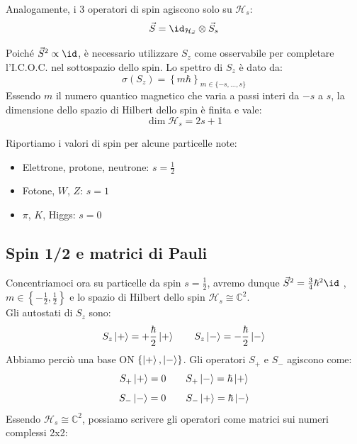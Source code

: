 Analogamente, i 3 operatori di spin agiscono solo su \(\mathcal{H}_s\):
\[
    \vec{S} = \id_{\mathcal{H}_{\vec{x}}} \otimes \vec{S}_s
\]

Poiché \(\vec{S}^2 \propto \id\), è necessario utilizzare \(S_z\) come osservabile per completare l'I.C.O.C. nel sottospazio dello spin. Lo spettro di \(S_z\) è dato da:
\begin{equation}
    \sigma(S_z) = \left\{ m\hbar \right\}_{m \in \{-s, \dots, s\}}
\end{equation}
Essendo \(m\) il numero quantico magnetico che varia a passi interi da \(-s\) a \(s\), la dimensione dello spazio di Hilbert dello spin è finita e vale:
\begin{equation}
    \dim \mathcal{H}_s = 2s+1
\end{equation}

\begin{example}
    Riportiamo i valori di spin per alcune particelle note:
    \begin{itemize}
        \item Elettrone, protone, neutrone: \( s = \frac{1}{2} \)
        \item Fotone, \( W \), \( Z \): \( s = 1 \)
        \item \( \pi \), \( K \), Higgs: \( s = 0 \)
    \end{itemize}
\end{example}



\subsection{Spin 1/2 e matrici di Pauli}

Concentriamoci ora su particelle da spin \(s = \frac{1}{2}\), avremo dunque \(\vec{S}^2= \frac{3}{4}\hbar^2 \id\) , \(m \in \left\{ -\frac{1}{2},\frac{1}{2} \right\}\) e lo spazio di Hilbert dello spin \(\mathcal{H}_s \cong\mathbb{C}^2\).\\
Gli autostati di \(S_z\) sono:
\[
    S_z\ket{+}=+ \frac{\hbar}{2} \ket{+} \qquad S_z\ket{-}=-\frac{\hbar}{2} \ket{-}
\]
Abbiamo perciò una base ON \(\left\{ \ket{+},\ket{-} \right\}\). Gli operatori \(S_+\) e \(S_-\) agiscono come:
\[
    S_+\ket{+}=0 \qquad S_+\ket{-}= \hbar\ket{+}
\]
\[ 
    S_-\ket{-}=0 \qquad S_-\ket{+}= \hbar\ket{-}
\]
Essendo \(\mathcal{H}_s \cong\mathbb{C}^2\), possiamo scrivere gli operatori come matrici sui numeri complessi 2x2:

